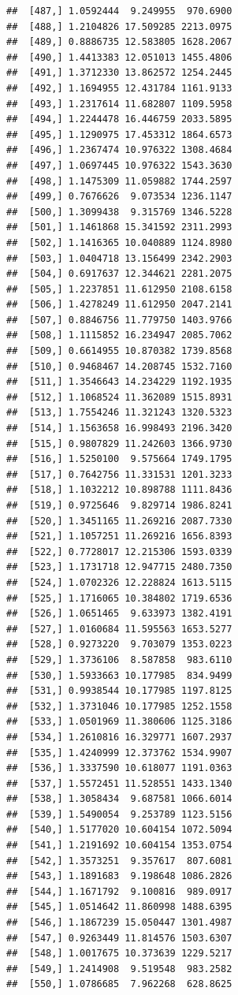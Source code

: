 \documentclass[article]{jss}\usepackage[]{graphicx}\usepackage[]{xcolor}
\makeatletter
\newenvironment{kframe}{%
 \def\at@end@of@kframe{}%
 \ifinner\ifhmode%
  \def\at@end@of@kframe{\end{minipage}}%
  \begin{minipage}{\columnwidth}%
 \fi\fi%
 \def\FrameCommand##1{\hskip\@totalleftmargin \hskip-\fboxsep
 \colorbox{shadecolor}{##1}\hskip-\fboxsep
     \hskip-\linewidth \hskip-\@totalleftmargin \hskip\columnwidth}%
 \MakeFramed {\advance\hsize-\width
   \@totalleftmargin\z@ \linewidth\hsize
   \@setminipage}}%
 {\par\unskip\endMakeFramed%
 \at@end@of@kframe}
\newenvironment{knitrout}{}{} %
\makeatother
\begin{document}
\begin{knitrout}
\begin{kframe}
\begin{verbatim}
##  [487,] 1.0592444  9.249955  970.6900
##  [488,] 1.2104826 17.509285 2213.0975
##  [489,] 0.8886735 12.583805 1628.2067
##  [490,] 1.4413383 12.051013 1455.4806
##  [491,] 1.3712330 13.862572 1254.2445
##  [492,] 1.1694955 12.431784 1161.9133
##  [493,] 1.2317614 11.682807 1109.5958
##  [494,] 1.2244478 16.446759 2033.5895
##  [495,] 1.1290975 17.453312 1864.6573
##  [496,] 1.2367474 10.976322 1308.4684
##  [497,] 1.0697445 10.976322 1543.3630
##  [498,] 1.1475309 11.059882 1744.2597
##  [499,] 0.7676626  9.073534 1236.1147
##  [500,] 1.3099438  9.315769 1346.5228
##  [501,] 1.1461868 15.341592 2311.2993
##  [502,] 1.1416365 10.040889 1124.8980
##  [503,] 1.0404718 13.156499 2342.2903
##  [504,] 0.6917637 12.344621 2281.2075
##  [505,] 1.2237851 11.612950 2108.6158
##  [506,] 1.4278249 11.612950 2047.2141
##  [507,] 0.8846756 11.779750 1403.9766
##  [508,] 1.1115852 16.234947 2085.7062
##  [509,] 0.6614955 10.870382 1739.8568
##  [510,] 0.9468467 14.208745 1532.7160
##  [511,] 1.3546643 14.234229 1192.1935
##  [512,] 1.1068524 11.362089 1515.8931
##  [513,] 1.7554246 11.321243 1320.5323
##  [514,] 1.1563658 16.998493 2196.3420
##  [515,] 0.9807829 11.242603 1366.9730
##  [516,] 1.5250100  9.575664 1749.1795
##  [517,] 0.7642756 11.331531 1201.3233
##  [518,] 1.1032212 10.898788 1111.8436
##  [519,] 0.9725646  9.829714 1986.8241
##  [520,] 1.3451165 11.269216 2087.7330
##  [521,] 1.1057251 11.269216 1656.8393
##  [522,] 0.7728017 12.215306 1593.0339
##  [523,] 1.1731718 12.947715 2480.7350
##  [524,] 1.0702326 12.228824 1613.5115
##  [525,] 1.1716065 10.384802 1719.6536
##  [526,] 1.0651465  9.633973 1382.4191
##  [527,] 1.0160684 11.595563 1653.5277
##  [528,] 0.9273220  9.703079 1353.0223
##  [529,] 1.3736106  8.587858  983.6110
##  [530,] 1.5933663 10.177985  834.9499
##  [531,] 0.9938544 10.177985 1197.8125
##  [532,] 1.3731046 10.177985 1252.1558
##  [533,] 1.0501969 11.380606 1125.3186
##  [534,] 1.2610816 16.329771 1607.2937
##  [535,] 1.4240999 12.373762 1534.9907
##  [536,] 1.3337590 10.618077 1191.0363
##  [537,] 1.5572451 11.528551 1433.1340
##  [538,] 1.3058434  9.687581 1066.6014
##  [539,] 1.5490054  9.253789 1123.5156
##  [540,] 1.5177020 10.604154 1072.5094
##  [541,] 1.2191692 10.604154 1353.0754
##  [542,] 1.3573251  9.357617  807.6081
##  [543,] 1.1891683  9.198648 1086.2826
##  [544,] 1.1671792  9.100816  989.0917
##  [545,] 1.0514642 11.860998 1488.6395
##  [546,] 1.1867239 15.050447 1301.4987
##  [547,] 0.9263449 11.814576 1503.6307
##  [548,] 1.0017675 10.373639 1229.5217
##  [549,] 1.2414908  9.519548  983.2582
##  [550,] 1.0786685  7.962268  628.8625

\end{verbatim}
\end{kframe}
\end{knitrout}
\end{document}
